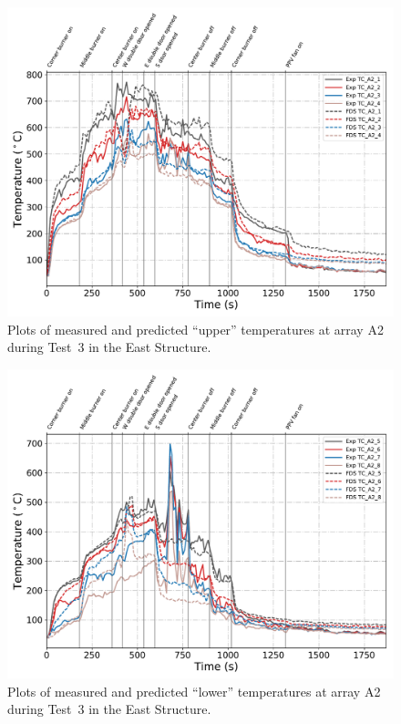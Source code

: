 \clearpage
\begin{figure}[p]
	\centering
	\includegraphics[width=\columnwidth]{Figures/Plots/Validation/Temperature/Test_3_TC_A2_upper}
	\caption{Plots of measured and predicted ``upper'' temperatures at array A2 during Test~3 in the East Structure.}
	\label{fig:TCA2_upper_data_Test3}
\end{figure}
\begin{figure}[p]
	\centering
	\includegraphics[width=\columnwidth]{Figures/Plots/Validation/Temperature/Test_3_TC_A2_lower}
	\caption{Plots of measured and predicted ``lower'' temperatures at array A2 during Test~3 in the East Structure.}
	\label{fig:TCA2_lower_data_Test3}
\end{figure}

